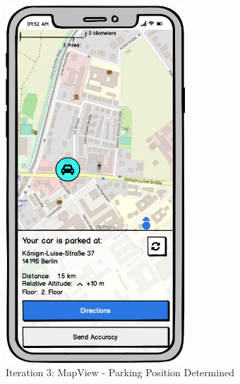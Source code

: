 \begin{figure}[H]
  \centering
  \begin{minipage}[b]{0.45\textwidth}
    \centering
    \includegraphics[width=0.6\textwidth]{images/UI/Iteration3-MapView-ParkingPositionDetermined.png}
    \caption{Iteration 3: MapView - Parking Position Determined}
    \label{fig:i3-mv-parking}
  \end{minipage}
  \hfill
  \begin{minipage}[b]{0.45\textwidth}
    \centering

\end{minipage}
\end{figure}
